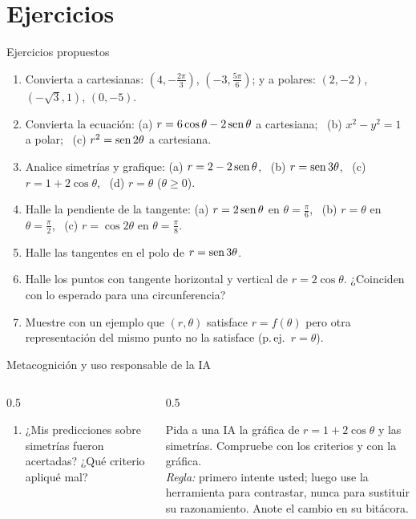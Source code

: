 \documentclass[10pt,aspectratio=169]{beamer}
\begin{document}
\section{Ejercicios}

\begin{frame}{Ejercicios propuestos}
  \small
  \begin{ejercicio}
    \begin{enumerate}
      \item Convierta a cartesianas: $\left(4,-\frac{2\pi}3\right)$, $\left(-3,\frac{5\pi}{6}\right)$; y a polares: $(2,-2)$, $(-\sqrt3,1)$, $(0,-5)$.
      \item Convierta la ecuación: (a) $r=6\cos\theta-2\operatorname{sen}\theta$ a cartesiana; \ (b) $x^2-y^2=1$ a polar; \ (c) $r^2=\operatorname{sen}2\theta$ a cartesiana.
      \item Analice simetrías y grafique: (a) $r=2-2\operatorname{sen}\theta$, \ (b) $r=\operatorname{sen}3\theta$, \ (c) $r=1+2\cos\theta$, \ (d) $r=\theta$ ($\theta\ge0$).
      \item Halle la pendiente de la tangente: (a) $r=2\operatorname{sen}\theta$ en $\theta=\frac\pi6$, \ (b) $r=\theta$ en $\theta=\frac\pi2$, \ (c) $r=\cos2\theta$ en $\theta=\frac\pi8$.
      \item Halle las tangentes en el polo de $r=\operatorname{sen}3\theta$.
      \item Halle los puntos con tangente horizontal y vertical de $r=2\cos\theta$. ¿Coinciden con lo esperado para una circunferencia?
      \item Muestre con un ejemplo que $(r,\theta)$ satisface $r=f(\theta)$ pero otra representación del mismo punto no la satisface (p.\,ej.\ $r=\theta$).
    \end{enumerate}
  \end{ejercicio}
\end{frame}

\begin{frame}{Metacognición y uso responsable de la IA}
  \small
  \begin{columns}[t]
    \begin{column}{0.5\textwidth}
      \begin{metacog}
        \begin{enumerate}
          \metacomun
          \item ¿Mis predicciones sobre simetrías fueron acertadas? ¿Qué criterio apliqué mal?
        \end{enumerate}
      \end{metacog}
    \end{column}
    \begin{column}{0.5\textwidth}
      \begin{iabox}
        Pida a una IA la gráfica de $r=1+2\cos\theta$ y las simetrías. Compruebe con los criterios y con la gráfica.\\[2pt]
        \textit{Regla:} primero intente usted; luego use la herramienta para contrastar, nunca para sustituir su razonamiento. Anote el cambio en su bitácora.
      \end{iabox}
    \end{column}
  \end{columns}
\end{frame}
\end{document}
